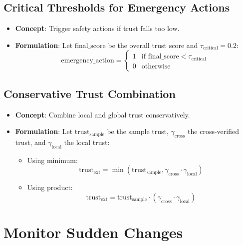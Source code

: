 \documentclass{article}
\begin{document}
\subsection{Critical Thresholds for Emergency Actions}
\begin{itemize}
    \item \textbf{Concept}: Trigger safety actions if trust falls too low.
    \item \textbf{Formulation}:  
    Let $\text{final\_score}$ be the overall trust score and $\tau_{\text{critical}} = 0.2$:
    \[
    \text{emergency\_action} = 
    \begin{cases} 
    1 & \text{if } \text{final\_score} < \tau_{\text{critical}} \\
    0 & \text{otherwise}
    \end{cases}
    \]
\end{itemize}

\subsection{Conservative Trust Combination}
\begin{itemize}
    \item \textbf{Concept}: Combine local and global trust conservatively.
    \item \textbf{Formulation}:  
    Let $\text{trust}_{\text{sample}}$ be the sample trust, $\gamma_{\text{cross}}$ the cross-verified trust, and $\gamma_{\text{local}}$ the local trust:
    \begin{itemize}
        \item Using minimum:
        \[
        \text{trust}_{\text{ext}} = \min(\text{trust}_{\text{sample}}, \gamma_{\text{cross}} \cdot \gamma_{\text{local}})
        \]
        \item Using product:
        \[
        \text{trust}_{\text{ext}} = \text{trust}_{\text{sample}} \cdot (\gamma_{\text{cross}} \cdot \gamma_{\text{local}})
        \]
    \end{itemize}
\end{itemize}

\section{Monitor Sudden Changes}
\end{document}
